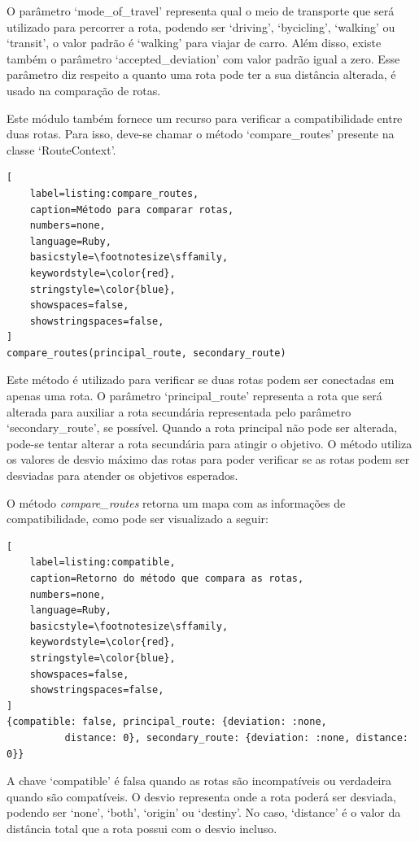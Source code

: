 O parâmetro `mode\_of\_travel'  representa qual o meio de transporte que será utilizado para percorrer a rota, podendo ser `driving', `bycicling', `walking' ou `transit', o valor padrão é `walking' para viajar de carro. Além disso, existe também o parâmetro `accepted\_deviation' com valor padrão igual a zero. Esse parâmetro diz respeito a quanto uma rota pode ter a sua distância alterada, é usado na comparação de rotas.

Este módulo também fornece um recurso para verificar a compatibilidade entre duas rotas. Para isso, deve-se chamar o método `compare\_routes' presente na classe `RouteContext'.

\begin{lstlisting}[
    label=listing:compare_routes,
    caption=Método para comparar rotas,
    numbers=none,
    language=Ruby,
    basicstyle=\footnotesize\sffamily,
    keywordstyle=\color{red},
    stringstyle=\color{blue},
    showspaces=false,
    showstringspaces=false,
]
compare_routes(principal_route, secondary_route)
\end{lstlisting}

Este método é utilizado para verificar se duas rotas podem ser conectadas em apenas uma rota. O parâmetro `principal\_route' representa a rota que será alterada para auxiliar a rota secundária representada pelo parâmetro `secondary\_route', se possível. Quando a rota principal não pode ser alterada, pode-se tentar alterar a rota secundária para atingir o objetivo. O método utiliza os valores de desvio máximo das rotas para poder verificar se as rotas podem ser desviadas para atender os objetivos esperados.

O método \textit{compare\_routes} retorna um mapa com as informações de compatibilidade, como pode ser visualizado a seguir:

\begin{lstlisting}[
    label=listing:compatible,
    caption=Retorno do método que compara as rotas,
    numbers=none,
    language=Ruby,
    basicstyle=\footnotesize\sffamily,
    keywordstyle=\color{red},
    stringstyle=\color{blue},
    showspaces=false,
    showstringspaces=false,
]
{compatible: false, principal_route: {deviation: :none,
          distance: 0}, secondary_route: {deviation: :none, distance: 0}}
\end{lstlisting}

A chave `compatible' é falsa quando as rotas são incompatíveis ou verdadeira quando são compatíveis. O desvio representa onde a rota poderá ser desviada, podendo ser `none', `both', `origin' ou `destiny'. No caso, `distance' é o valor da distância total que a rota possui com o desvio incluso.

